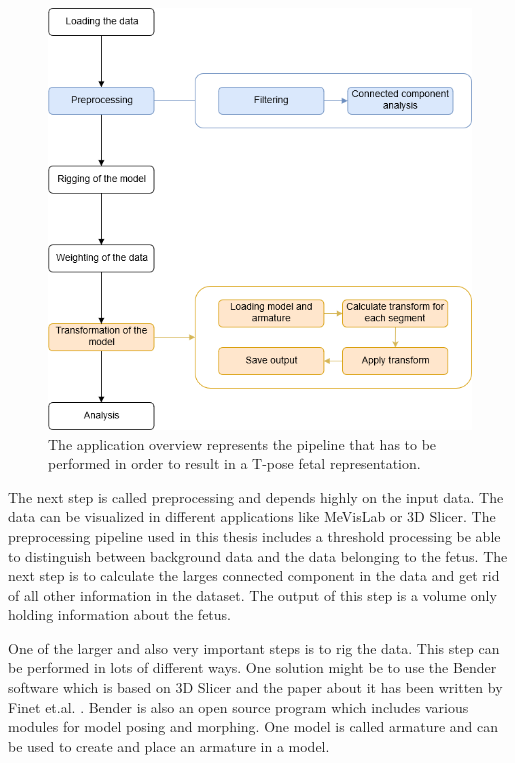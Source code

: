 \begin{figure}
    \centering
	\includegraphics[width=15cm]{content/images/MethodsOverview}
	\caption{The application overview represents the pipeline that has to be performed in order to result in a T-pose fetal representation.} 
	\label{fig:methodsOverview}
\end{figure}

The next step is called preprocessing and depends highly on the input data. The data can be visualized in different applications like MeVisLab or 3D Slicer. The preprocessing pipeline used in this thesis includes a threshold processing be able to distinguish between background data and the data belonging to the fetus. The next step is to calculate the larges connected component in the data and get rid of all other information in the dataset. The output of this step is a volume only holding information about the fetus.\newline

One of the larger and also very important steps is to rig the data. This step can be performed in lots of different ways. One solution might be to use the Bender software which is based on 3D Slicer and the paper about it has been written by Finet et.al. \cite{Finet2014Bender:Morphing}. Bender is also an open source program which includes various modules for model posing and morphing. One model is called armature and can be used to create and place an armature in a model.\newline

